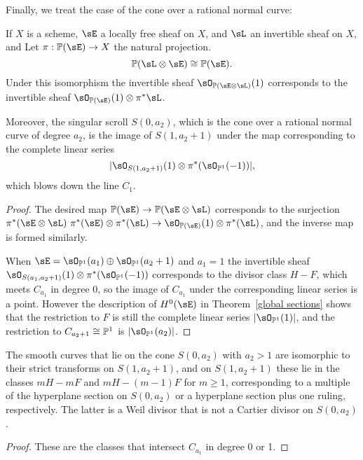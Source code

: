 Finally, we treat the case of the cone over a rational normal curve:
\begin{proposition}\label{singular scrolls}
If $X$ is a scheme, $\sE$ a locally free sheaf on $X$, and $\sL$ an invertible sheaf on $X$, 
and Let $\pi: \PP(\sE)\to X$ the natural projection.
$$
\PP(\sL \otimes \sE)\cong \PP(\sE).
$$
Under this isomorphism the invertible sheaf $\sO_{\PP(\sE\otimes \sL)}(1)$ corresponds to the invertible sheaf
$\sO_{\PP(\sE)}(1)\otimes \pi^{*}\sL$. 

Moreover, the singular scroll $S(0,a_{2})$, which is the cone over a rational normal curve of degree $a_{2}$, is the image of
$S(1, a_{2}+1)$ under the map corresponding to the complete linear series 
$$
|\sO_{S(1, a_{2}+1)}(1) \otimes \pi^{*}(\sO_{\PP^{1}}(-1))|,
$$
which blows down the line $C_{1}$.
\end{proposition}

\begin{proof} 
The desired map $\PP(\sE) \to \PP(\sE\otimes \sL)$ corresponds to the surjection 
$\pi^*(\sE \otimes\sL) \ \pi^*(\sE) \otimes \pi^*(\sL) \to \sO_{\PP(\sE)}(1) \otimes \pi^*(\sL)$, 
and the inverse map is formed similarly.

When $\sE = \sO_{\PP^1}(a_1)\oplus \sO_{\PP^1}(a_2+1)$ and $a_1 = 1$ the
invertible sheaf
$\sO_{S(a_1, a_{2}+1)}(1) \otimes \pi^{*}(\sO_{\PP^{1}}(-1))$ corresponds to the divisor class $H-F$, which meets $C_{a_1}$  in degree 0, so the image
of $C_{a_1}$ under the corresponding linear series is a point. However the description of  $H^0(\sE)$ in
Theorem~\ref{global sections} shows that the restriction to $F$
is still the complete linear series $|\sO_{\PP^1}(1)|$, and the restriction to $C_{{a_2}+1}\cong \PP^1$
is $|\sO_{\PP^1}(a_2)|$.
\end{proof}

\begin{corollary}\label{curves on a singular scroll}
 The smooth curves that lie on the cone $S(0,a_2)$ with $a_2>1$ are isomorphic to their strict transforms
 on $S(1,a_2+1)$, and on $S(1,a_2+1)$ these lie in the classes $mH-mF$ and $mH-(m-1)F$ for $m\geq 1$, 
 corresponding to a multiple of the hyperplane section on $S(0,a_2)$ or a hyperplane section plus one ruling,
 respectively. The latter is a Weil divisor that is not a Cartier divisor on $S(0,a_2)$.
\end{corollary}

\begin{proof}
These are the classes that intersect $C_{a_1}$ in degree 0 or 1.
\end{proof}

